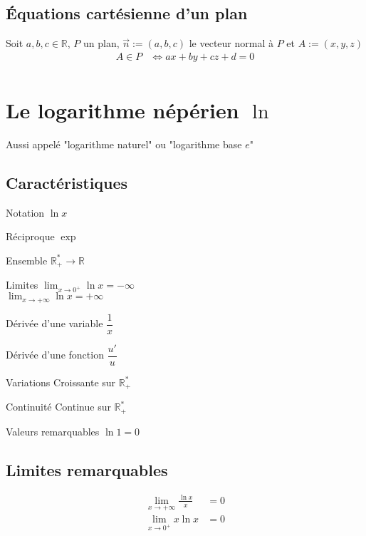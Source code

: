 \documentclass{article}
\newcommand{\R}{\mathds{R}}
\newenvironment{descriptiona}{\begin{description}[leftmargin=!,labelwidth=\widthof{\bfseries The longest label}]}{\end{description}}
\begin{document}
\subsection{Équations cartésienne d'un plan}
Soit $a, b, c\in \R$, $P$ un plan, $\vec n := (a, b, c)$ le vecteur normal à $P$ et $A := (x, y, z)$
\begin{align*}
	A \in P &\iff ax+by+cz+d= 0 \\
\end{align*}

\newpage
\section{Le logarithme népérien $\ln$}

Aussi appelé "logarithme naturel" ou "logarithme base $e$"

\subsection{Caractéristiques}
\begin{descriptiona}
	\item[Notation] $\ln{x}$
	\item[Réciproque] $\exp$
	\item[Ensemble] $\R_+^\ast \to \R$
	\item[Limites]
	    $\displaystyle \lim_{x\to0^+} \ln{x} = -\infty$ \\
	    $\displaystyle \lim_{x\to+\infty} \ln{x} = +\infty$
	\item[Dérivée d'une variable] $\dfrac{1}{x}$
	\item[Dérivée d'une fonction] $\dfrac{u'}{u}$
	\item[Variations] Croissante sur $\R_+^\ast$
	\item[Continuité] Continue sur $\R_+^\ast$
	\item[Valeurs remarquables] $\ln{1} = 0$
\end{descriptiona}

\subsection{Limites remarquables}

\begin{equation*}
    \begin{split}
        \lim_{x\to+\infty} \frac{\ln x}{x} &= 0 \\
        \lim_{x\to0^+} x\ln x &= 0
    \end{split}
\end{equation*}
\end{document}
